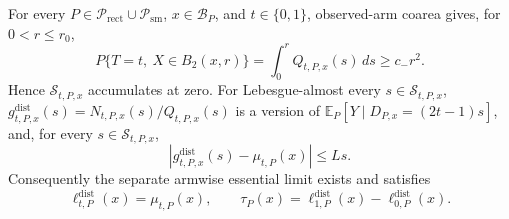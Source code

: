 For every \(P\in\mathcal P_{\mathrm{rect}}\cup\mathcal P_{\mathrm{sm}}\),
\(x\in\mathcal B_P\), and \(t\in\{0,1\}\), observed-arm coarea gives,
for \(0<r\leq r_0\),
\[
 P\{T=t,\ X\in B_2(x,r)\}
 =\int_0^rQ_{t,P,x}(s)\,ds\geq c_-r^2.
\]
Hence \(\mathcal S_{t,P,x}\) accumulates at zero.  For
Lebesgue-almost every \(s\in\mathcal S_{t,P,x}\),
\(g^{\mathrm{dist}}_{t,P,x}(s)=N_{t,P,x}(s)/Q_{t,P,x}(s)\)
is a version of
\(\mathbb E_P[Y\mid D_{P,x}=(2t-1)s]\), and, for every
\(s\in\mathcal S_{t,P,x}\),
\[
 \left|g^{\mathrm{dist}}_{t,P,x}(s)-\mu_{t,P}(x)\right|\leq Ls.
\]
Consequently the separate armwise essential limit exists and satisfies
\[
 \ell^{\mathrm{dist}}_{t,P}(x)=\mu_{t,P}(x),
 \qquad
 \tau_P(x)=\ell^{\mathrm{dist}}_{1,P}(x)
 -\ell^{\mathrm{dist}}_{0,P}(x).
\]